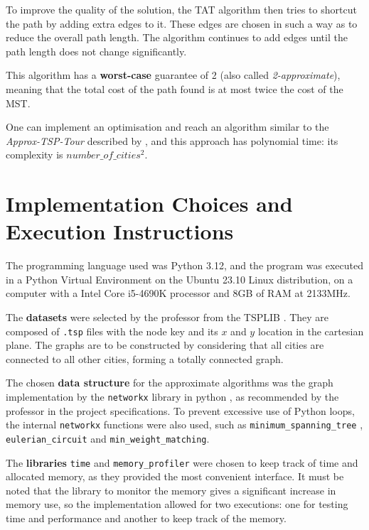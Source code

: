\documentclass[12pt]{article}
\begin{document}
To improve the quality of the solution, the TAT algorithm then tries to shortcut the 
path by adding extra edges to it. These edges are chosen in such a way as to reduce 
the overall path length. The algorithm continues to add edges until the path length 
does not change significantly.

This algorithm has a \textbf{worst-case} guarantee of 2 (also called \textit{2-approximate}), meaning 
that the total cost of the path found is at most twice the cost of the MST.

One can implement an optimisation and reach an algorithm similar to the \textit{Approx-TSP-Tour} 
described by \cite{cormen}, and this approach has polynomial time: its complexity is $number\_of\_cities^2$.

\section{Implementation Choices and Execution Instructions} \label{sec:implementation}

The programming language used was Python 3.12, and the program was executed 
in a Python Virtual Environment on the Ubuntu 23.10 Linux distribution, on a computer with a 
Intel Core i5-4690K processor and 8GB of RAM at 2133MHz.

The \textbf{datasets} were selected by the professor from the TSPLIB \cite{dataset_lib}. They are 
composed of \texttt{.tsp} files with the node key and its $x$ and $y$ location in the cartesian plane. 
The graphs are to be constructed by considering that all cities are connected to all other cities, forming 
a totally connected graph.

The chosen \textbf{data structure} for the approximate algorithms was the graph implementation 
by the \texttt{networkx} library in python \cite{networkx_docs}, as recommended by 
the professor in the project specifications. To prevent excessive use of Python loops, 
the internal \texttt{networkx} functions were also used, such as \texttt{minimum\_spanning\_tree} , 
\texttt{eulerian\_circuit} and \texttt{min\_weight\_matching}.

The \textbf{libraries} \texttt{time} and \texttt{memory\_profiler} were chosen to keep track of time 
and allocated memory, as they provided the most convenient interface. It must be noted that the library 
to monitor the memory gives a significant increase in memory use, so the implementation allowed for 
two executions: one for testing time and performance and another to keep track of the memory.
\end{document}
